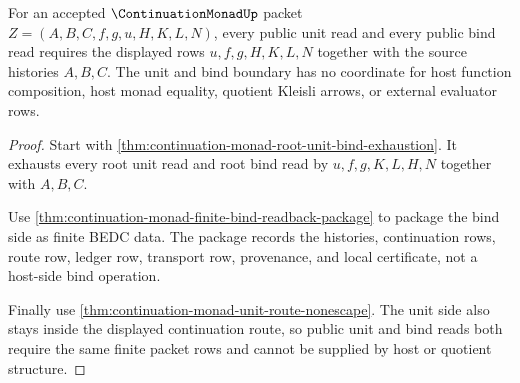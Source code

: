 \begin{theorem}
\label{thm:continuation-monad-root-bind-unit-boundary}
For an accepted $\ContinuationMonadUp$ packet $Z=(A,B,C,f,g,u,H,K,L,N)$,
every public unit read and every public bind read requires the displayed rows
$u,f,g,H,K,L,N$ together with the source histories $A,B,C$. The unit and bind
boundary has no coordinate for host function composition, host monad
equality, quotient Kleisli arrows, or external evaluator rows.
\end{theorem}
\begin{proof}
Start with \autoref{thm:continuation-monad-root-unit-bind-exhaustion}. It
exhausts every root unit read and root bind read by $u,f,g,K,L,H,N$ together
with $A,B,C$.

Use \autoref{thm:continuation-monad-finite-bind-readback-package} to package
the bind side as finite BEDC data. The package records the histories,
continuation rows, route row, ledger row, transport row, provenance, and
local certificate, not a host-side bind operation.

Finally use \autoref{thm:continuation-monad-unit-route-nonescape}. The unit
side also stays inside the displayed continuation route, so public unit and
bind reads both require the same finite packet rows and cannot be supplied by
host or quotient structure.
\end{proof}

